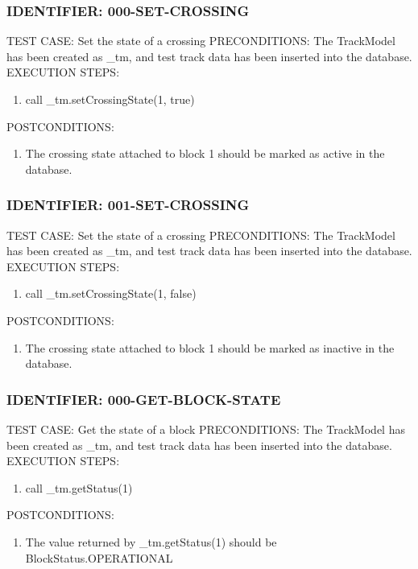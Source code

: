 \documentclass{scrreprt}
\begin{document}
\subsubsection{IDENTIFIER: 000-SET-CROSSING}
TEST CASE: Set the state of a crossing
PRECONDITIONS: The TrackModel has been created as _tm, and test track data has been inserted into the database.
EXECUTION STEPS:
\begin{enumerate}
	\item call _tm.setCrossingState(1, true)
\end{enumerate}
POSTCONDITIONS:
\begin{enumerate}
	\item The crossing state attached to block 1 should be marked as active in the database.
\end{enumerate}

\subsubsection{IDENTIFIER: 001-SET-CROSSING}
TEST CASE: Set the state of a crossing
PRECONDITIONS: The TrackModel has been created as _tm, and test track data has been inserted into the database.
EXECUTION STEPS:
\begin{enumerate}
	\item call _tm.setCrossingState(1, false)
\end{enumerate}
POSTCONDITIONS:
\begin{enumerate}
	\item The crossing state attached to block 1 should be marked as inactive in the database.
\end{enumerate}

\subsubsection{IDENTIFIER: 000-GET-BLOCK-STATE}
TEST CASE: Get the state of a block
PRECONDITIONS: The TrackModel has been created as _tm, and test track data has been inserted into the database.
EXECUTION STEPS:
\begin{enumerate}
	\item call _tm.getStatus(1)
\end{enumerate}
POSTCONDITIONS:
\begin{enumerate}
	\item The value returned by _tm.getStatus(1) should be BlockStatus.OPERATIONAL
\end{enumerate}
\end{document}

